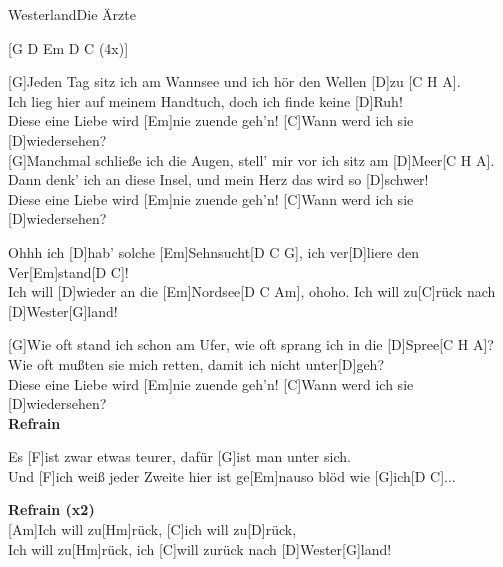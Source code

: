 \begin{song}{Westerland}{Die Ärzte}
    \begin{guitarMagic}

        [G D Em D C (4x)]
        
        [G]Jeden Tag sitz ich am Wannsee und ich hör den Wellen [D]zu [C H A]. \\
        [G]Ich lieg hier auf meinem Handtuch, doch ich finde keine [D]Ruh! \\
        [C]Diese eine Liebe wird [Em]nie zuende geh'n! [C]Wann werd ich sie [D]wiedersehen? \\
        
        [G]Manchmal schließe ich die Augen, stell' mir vor ich sitz am [D]Meer[C H A]. \\
        [G]Dann denk' ich an diese Insel, und mein Herz das wird so [D]schwer! \\
        [C]Diese eine Liebe wird [Em]nie zuende geh'n! [C]Wann werd ich sie [D]wiedersehen? 

        \begin{chorus}
            [G]Ohhh ich [D]hab' solche [Em]Sehnsucht[D C G], 
            \hspace{1em}ich ver[D]liere den Ver[Em]stand[D C]! \\
            [G]Ich will [D]wieder an die [Em]Nordsee[D C Am], \hspace{1.5 em}ohoho. 
            Ich will zu[C]rück nach [D]Wester[G]land!
        \end{chorus}

        [G]Wie oft stand ich schon am Ufer, wie oft sprang ich in die [D]Spree[C H A]? \\
        [G]Wie oft mußten sie mich retten, damit ich nicht unter[D]geh? \\
        [C]Diese eine Liebe wird [Em]nie zuende geh'n! [C]Wann werd ich sie [D]wiedersehen? \\
        
        \textbf{Refrain}
        
        \begin{bridge}
            Es [F]ist zwar etwas teurer, dafür [G]ist man unter sich. \\
            Und [F]ich weiß jeder Zweite hier ist ge[Em]nauso blöd wie [G]ich[D C]... \\
        \end{bridge}
        
        \textbf{Refrain (x2)} \\
        
        [Am]Ich will zu[Hm]rück, [C]ich will zu[D]rück,\\
        [Am]Ich will zu[Hm]rück, ich [C]will zurück nach [D]Wester[G]land!\\

    \end{guitarMagic}
\end{song}
